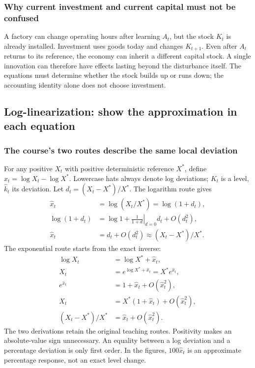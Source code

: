 \subsubsection{Why current investment and current capital must not be confused}

A factory can change operating hours after learning $A_t$, but the stock
$K_t$ is already installed. Investment uses goods today and changes
$K_{t+1}$. Even after $A_t$ returns to its reference, the economy can inherit
a different capital stock. A single innovation can therefore have effects
lasting beyond the disturbance itself. The equations must determine whether
the stock builds up or runs down; the accounting identity alone does not
choose investment.

\subsection{Log-linearization: show the approximation in each equation}\label{sec:rbc-loglinear}

\subsubsection{The course's two routes describe the same local deviation}

For any positive $X_t$ with positive deterministic reference $X^*$, define
$\hat x_t=\log X_t-\log X^*$. Lowercase hats always denote log deviations;
$K_t$ is a level, $\hat k_t$ its deviation. Let $d_t=(X_t-X^*)/X^*$.
The logarithm route gives
\begin{align}
\hat x_t&=\log(X_t/X^*)=\log(1+d_t),\\
\log(1+d_t)&=\log1+\left.\frac{1}{1+d}\right|_{d=0}d_t+O(d_t^2),\\
\hat x_t&=d_t+O(d_t^2)\approx (X_t-X^*)/X^*.
\end{align}
The exponential route starts from the exact inverse:
\begin{align}
\log X_t&=\log X^*+\hat x_t,\\
X_t&=e^{\log X^*+\hat x_t}=X^*e^{\hat x_t},\\
e^{\hat x_t}&=1+\hat x_t+O(\hat x_t^2),\\
X_t&=X^*(1+\hat x_t)+O(\hat x_t^2),\\
(X_t-X^*)/X^*&=\hat x_t+O(\hat x_t^2).
\end{align}
The two derivations retain the original teaching routes. Positivity makes an
absolute-value sign unnecessary. An equality between a log deviation and a
percentage deviation is only first order. In the figures, $100\hat x_t$ is an
approximate percentage response, not an exact level change.

